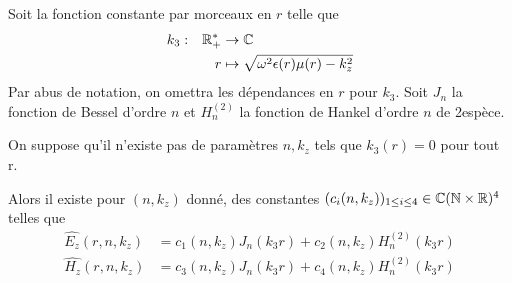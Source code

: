   \begin{prop}
    Soit la fonction constante par morceaux en \(r\) telle que
    \begin{equation}
      \begin{aligned} &k_3: & \mathbb R_+^* &\rightarrow \mathbb C \\ & & r & \mapsto \sqrt{\omega^2\epsilon(r)\mu(r) - k_z^2} \end{aligned}
    \end{equation}
    Par abus de notation, on omettra les dépendances en \(r\) pour \(k_3\).
    Soit \(J_n\) la fonction de Bessel d'ordre \(n\) et \(H_n^{(2)}\) la fonction de Hankel d'ordre \(n\) de 2\ieme espèce.

    On suppose qu'il n'existe pas de paramètres \(n,k_z\) tels que \(k_3(r) = 0\) pour tout r.

    Alors il existe pour \((n,k_z)\) donné, des constantes \((c_i(n,k_z))_{1\le i\le 4} \in \mathbb C(\mathbb N\times\mathbb R)^4\) telles que
    \begin{subequations}
      \begin{align}
        \hat{E_z}(r,n,k_z) &= c_1(n,k_z) J_n\left(k_3r\right) + c_2(n,k_z) H_n^{(2)}\left(k_3r\right)
        \\
        \hat{H_z}(r,n,k_z) &= c_3(n,k_z) J_n\left(k_3r\right) + c_4(n,k_z) H_n^{(2)}\left(k_3r\right)
      \end{align}
    \end{subequations}
  \end{prop}

